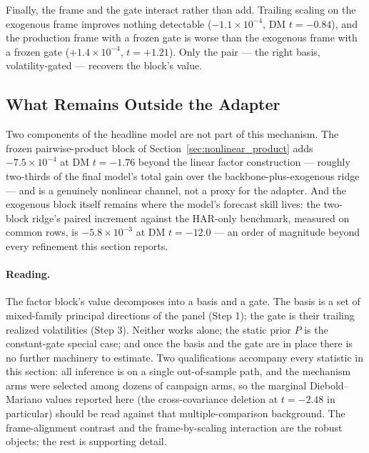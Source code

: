 Finally, the frame and the gate interact rather than add. Trailing
scaling on the exogenous frame improves nothing detectable
($-1.1 \times 10^{-4}$, DM $t = -0.84$), and the production frame with a
frozen gate is worse than the exogenous frame with a frozen gate
($+1.4 \times 10^{-4}$, $t = +1.21$). Only the pair --- the right basis,
volatility-gated --- recovers the block's value.

\subsection{What Remains Outside the Adapter}
\label{sec:pca_outside}

Two components of the headline model are not part of this mechanism. The
frozen pairwise-product block of Section~\ref{sec:nonlinear_product}
adds $-7.5 \times 10^{-4}$ at DM $t = -1.76$ beyond the linear factor
construction --- roughly two-thirds of the final model's total gain over
the backbone-plus-exogenous ridge --- and is a genuinely nonlinear
channel, not a proxy for the adapter. And the exogenous block itself
remains where the model's forecast skill lives: the two-block ridge's
paired increment against the HAR-only benchmark, measured on common rows,
is $-5.8 \times 10^{-3}$ at DM $t = -12.0$ --- an order of magnitude
beyond every refinement this section reports.

\paragraph{Reading.}
The factor block's value decomposes into a basis and a gate. The basis
is a set of mixed-family principal directions of the panel (Step 1); the
gate is their trailing realized volatilities (Step 3). Neither works
alone; the static prior $P$ is the constant-gate special case; and once
the basis and the gate are in place there is no further machinery to
estimate. Two qualifications accompany every statistic in this section:
all inference is on a single out-of-sample path, and the mechanism arms
were selected among dozens of campaign arms, so the marginal
Diebold--Mariano values reported here (the cross-covariance deletion at
$t = -2.48$ in particular) should be read against that
multiple-comparison background. The frame-alignment contrast and the
frame-by-scaling interaction are the robust objects; the rest is
supporting detail.
